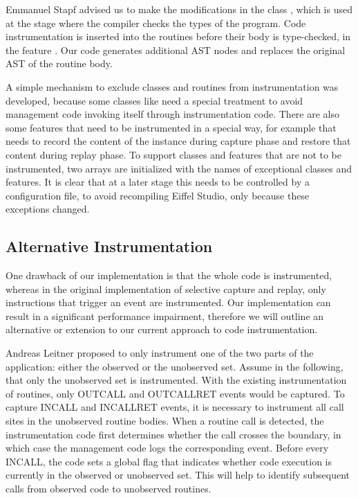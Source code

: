 Emmanuel Stapf advised us to make the modifications in the class , which is used at the stage where the compiler checks the types of the program. Code instrumentation is inserted into the routines before their body is type-checked, in the feature . Our code generates additional AST nodes and replaces the original AST of the routine body.

A simple mechanism to exclude classes and routines from instrumentation was developed, because some classes like  need a special treatment to avoid management code invoking itself through instrumentation code. There are also some features that need to be instrumented in a special way, for example  that needs to record the content of the instance during capture phase and restore that content during replay phase. To support classes and features that are not to be instrumented, two arrays are initialized with the names of exceptional classes and features. It is clear that at a later stage this needs to be controlled by a configuration file, to avoid recompiling Eiffel Studio, only because these exceptions changed.


\subsection{Alternative Instrumentation}
\label{lbl:single-sided_instrumentation}
One drawback of our implementation is that the whole code is instrumented, whereas in the original implementation of selective capture and replay, only instructions that trigger an event are instrumented. Our implementation can result in a significant performance impairment, therefore we will outline an alternative or extension to our current approach to code instrumentation.

Andreas Leitner proposed to only instrument one of the two parts of the application: either the observed or the unobserved set. Assume in the following, that only the unobserved set is instrumented. With the existing instrumentation of routines, only OUTCALL and OUTCALLRET events would be captured. To capture INCALL and INCALLRET events, it is necessary to instrument all call sites in the unobserved routine bodies. When a routine call is detected, the instrumentation code first determines whether the call crosses the boundary, in which case the management code logs the corresponding event. Before every INCALL, the code sets a global flag that indicates whether code execution is currently in the observed or unobserved set. This will help to identify subsequent calls from observed code to unobserved routines.


